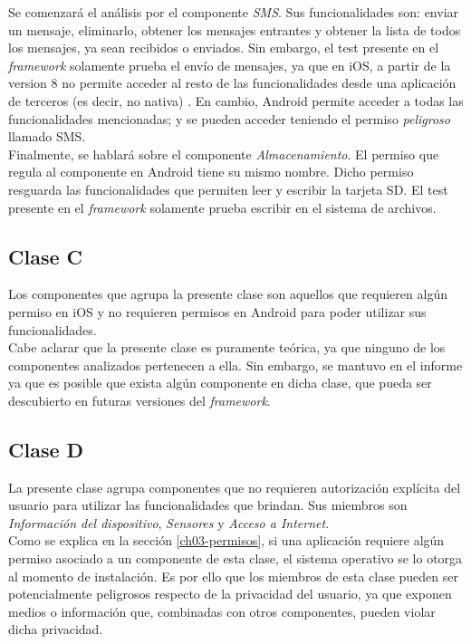 Se comenzará el análisis por el componente \emph{SMS}. Sus funcionalidades son: enviar un mensaje, eliminarlo, obtener los mensajes entrantes y obtener la lista de todos los mensajes, ya sean recibidos o enviados. Sin embargo, el test presente en el \textit{framework} solamente prueba el envío de mensajes, ya que en iOS, a partir de la version 8 no permite acceder al resto de las funcionalidades desde una aplicación de terceros (es decir, no nativa) \cite{foda, foda2}. En cambio, Android permite acceder a todas las funcionalidades mencionadas; y se pueden acceder teniendo el permiso \textit{peligroso} llamado SMS.\\

Finalmente, se hablará sobre el componente \emph{Almacenamiento}. El permiso que regula al componente en Android tiene su mismo nombre. Dicho permiso resguarda las funcionalidades que permiten leer y escribir la tarjeta SD. El test presente en el \textit{framework} solamente prueba escribir en el sistema de archivos.
\subsection{Clase C}
Los componentes que agrupa la presente clase son aquellos que requieren algún permiso en iOS y no requieren permisos en Android para poder utilizar sus funcionalidades.\\

Cabe aclarar que la presente clase es puramente teórica, ya que ninguno de los componentes analizados pertenecen a ella. Sin embargo, se mantuvo en el informe ya que es posible que exista algún componente en dicha clase, que pueda ser descubierto en futuras versiones del \textit{framework}.
\subsection{Clase D}
La presente clase agrupa componentes que no requieren autorización explícita del usuario para utilizar las funcionalidades que brindan. Sus miembros son \emph{Información del dispositivo}, \emph{Sensores} y \emph{Acceso a Internet}.\\

Como se explica en la sección \ref{ch03-permisos}, si una aplicación requiere algún permiso asociado a un componente de esta clase, el sistema operativo se lo otorga al momento de instalación. Es por ello que los miembros de esta clase pueden ser potencialmente peligrosos respecto de la privacidad del usuario, ya que exponen medios o información que, combinadas con otros componentes, pueden violar dicha privacidad.\\

